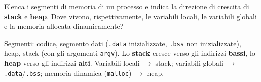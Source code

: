 \question[4]
Elenca i segmenti di memoria di un processo e indica la direzione di crescita di \textbf{stack} e \textbf{heap}.
Dove vivono, rispettivamente, le variabili locali, le variabili globali e la memoria allocata dinamicamente?
\begin{solution}
Segmenti: codice, segmento dati (\lstinline|.data| inizializzate, \lstinline|.bss| non inizializzate), heap, stack (con gli argomenti \lstinline|argv|).
Lo \textbf{stack} cresce verso gli indirizzi \textbf{bassi}, lo \textbf{heap} verso gli indirizzi \textbf{alti}.
Variabili locali $\to$ stack; variabili globali $\to$ \lstinline|.data|/\lstinline|.bss|; memoria dinamica (\lstinline|malloc|) $\to$ heap.
\end{solution}
